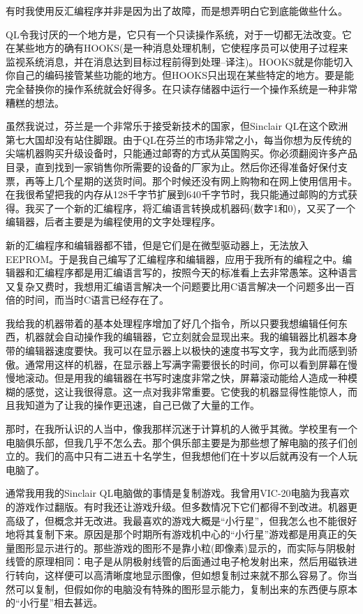 有时我使用反汇编程序并非是因为出了故障，而是想弄明白它到底能做些什么。

QL令我讨厌的一个地方是，它只有一个只读操作系统，对于一切都无法改变。它在某些地方的确有HOOKS(是一种消息处理机制，它使程序员可以使用子过程来监视系统消息，并在消息达到目标过程前得到处理--译注)。HOOKS就是你能切入你自己的编码接管某些功能的地方。但HOOKS只出现在某些特定的地方。要是能完全替换你的操作系统就会好得多。在只读存储器中运行一个操作系统是一种非常糟糕的想法。

虽然我说过，芬兰是一个非常乐于接受新技术的国家，但Sinclair QL在这个欧洲第七大国却没有站住脚跟。由于QL在芬兰的市场非常之小，每当你想为反传统的尖端机器购买升级设备时，只能通过邮寄的方式从英国购买。你必须翻阅许多产品目录，直到找到一家销售你所需要的设备的厂家为止。然后你还得准备好保付支票，再等上几个星期的送货时间。那个时候还没有网上购物和在网上使用信用卡。在我很希望把我的内存从128千字节扩展到640千字节时，我只能通过邮购的方式获得。我买了一个新的汇编程序，将汇编语言转换成机器码(数字1和0)，又买了一个编辑器，后者主要是为编程使用的文字处理程序。

新的汇编程序和编辑器都不错，但是它们是在微型驱动器上，无法放入EEPROM。于是我自己编写了汇编程序和编辑器，应用于我所有的编程之中。编辑器和汇编程序都是用汇编语言写的，按照今天的标准看上去非常愚笨。这种语言又复杂又费时，我想用汇编语言解决一个问题要比用C语言解决一个问题多出一百倍的时间，而当时C语言已经存在了。

我给我的机器带着的基本处理程序增加了好几个指令，所以只要我想编辑任何东西，机器就会自动操作我的编辑器，它立刻就会显现出来。我的编辑器比机器本身带的编辑器速度要快。我可以在显示器上以极快的速度书写文字，我为此而感到骄傲。通常用这样的机器，在显示器上写满字需要很长的时间，你可以看到屏幕在慢慢地滚动。但是用我的编辑器在书写时速度非常之快，屏幕滚动能给人造成一种模糊的感觉，这让我很得意。这一点对我非常重要。它使我的机器显得性能惊人，而且我知道为了让我的操作更迅速，自己已做了大量的工作。

那时，在我所认识的人当中，像我那样沉迷于计算机的人微乎其微。学校里有一个电脑俱乐部，但我几乎不怎么去。那个俱乐部主要是为那些想了解电脑的孩子们创立的。我们的高中只有二进五十名学生，但我想他们在十岁以后就再没有一个人玩电脑了。

通常我用我的Sinclair QL电脑做的事情是复制游戏。我曾用VIC-20电脑为我喜欢的游戏作过翻版。有时我还让游戏升级。但多数情况下它们都得不到改进。机器更高级了，但概念并无改进。我最喜欢的游戏大概是“小行星”，但我怎么也不能很好地将其复制下来。原因是那个时期所有游戏机中心的“小行星”游戏都是用真正的矢量图形显示进行的。那些游戏的图形不是靠小粒(即像素)显示的，而实际与阴极射线管的原理相同：电子是从阴极射线管的后面通过电子枪发射出来，然后用磁铁进行转向，这样便可以高清晰度地显示图像，但如想复制过来就不那么容易了。你当然可以复制，但假如你的电脑没有特殊的图形显示能力，复制出来的东西便与原本的“小行星”相去甚远。

